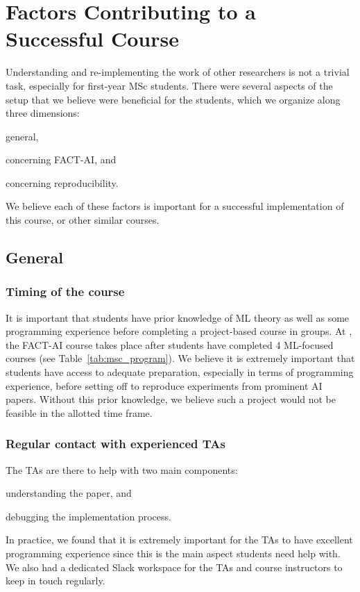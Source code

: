 

\section{Factors Contributing to a Successful Course}
\label{section:whatworked}

Understanding and re-implementing the work of other researchers is not a trivial task, especially for first-year MSc students. There were several aspects of the setup that we believe were beneficial for the students, which we organize along three dimensions: 
\begin{enumerate*}[label=(\roman*)]
    \item general, 
    \item concerning FACT-AI, and 
    \item concerning reproducibility.
\end{enumerate*}
We believe each of these factors is important for a successful implementation of this course, or other similar courses. 

\subsection{General}

\subsubsection{Timing of the course}
It is important that students have prior knowledge of ML theory as well as some programming experience before completing a project-based course in groups. At \OurUniversity{}, the FACT-AI course takes place after students have completed 4 ML-focused courses (see Table~\ref{tab:msc_program}). 
We believe it is extremely important that students have access to adequate preparation, especially in terms of programming experience, before setting off to reproduce experiments from prominent AI papers. 
Without this prior knowledge, we believe such a project would not be feasible in the allotted time frame. 

\subsubsection{Regular contact with experienced TAs}
The TAs are there to help with two main components: 
\begin{enumerate*}[label=(\roman*)]
\item understanding the paper, and 
\item debugging the implementation process. 
\end{enumerate*}
In practice, we found that it is extremely important for the TAs to have excellent programming experience since this is the main aspect students need help with. 
We also had a dedicated Slack workspace for the TAs and course instructors to keep in touch regularly. 

